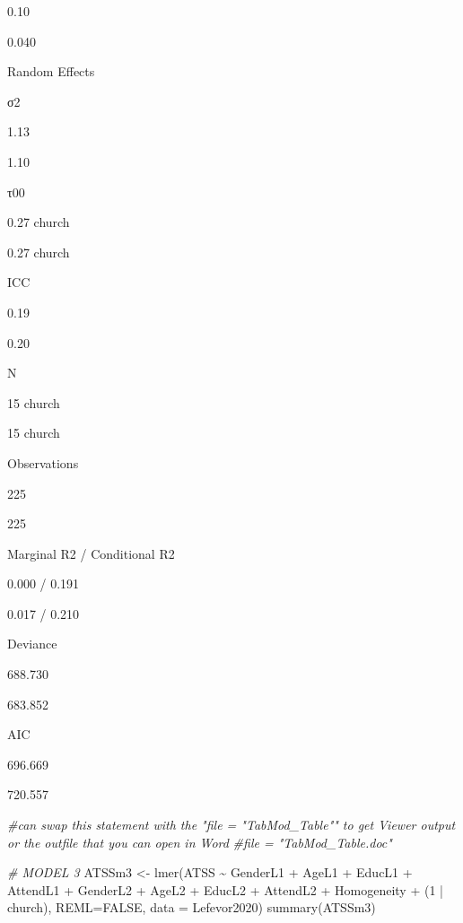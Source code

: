 \documentclass[
  11pt,
]{book}
\newenvironment{Shaded}{\begin{snugshade}}{\end{snugshade}}
\newcommand{\AttributeTok}[1]{\textcolor[rgb]{0.77,0.63,0.00}{#1}}
\newcommand{\CommentTok}[1]{\textcolor[rgb]{0.56,0.35,0.01}{\textit{#1}}}
\newcommand{\ConstantTok}[1]{\textcolor[rgb]{0.00,0.00,0.00}{#1}}
\newcommand{\DecValTok}[1]{\textcolor[rgb]{0.00,0.00,0.81}{#1}}
\newcommand{\FunctionTok}[1]{\textcolor[rgb]{0.00,0.00,0.00}{#1}}
\newcommand{\NormalTok}[1]{#1}
\newcommand{\OtherTok}[1]{\textcolor[rgb]{0.56,0.35,0.01}{#1}}
\newcommand{\SpecialCharTok}[1]{\textcolor[rgb]{0.00,0.00,0.00}{#1}}
\begin{document}
0.10

0.040

Random Effects

σ2

1.13

1.10

τ00

0.27 church

0.27 church

ICC

0.19

0.20

N

15 church

15 church

Observations

225

225

Marginal R2 / Conditional R2

0.000 / 0.191

0.017 / 0.210

Deviance

688.730

683.852

AIC

696.669

720.557

\begin{Shaded}
\begin{Highlighting}[]
\CommentTok{\#can swap this statement with the "file = "TabMod\_Table"" to get Viewer output or the outfile that you can open in Word}
\CommentTok{\#file = "TabMod\_Table.doc"}
\end{Highlighting}
\end{Shaded}

\begin{Shaded}
\begin{Highlighting}[]
\CommentTok{\# MODEL 3}
\NormalTok{ATSSm3 }\OtherTok{\textless{}{-}} \FunctionTok{lmer}\NormalTok{(ATSS }\SpecialCharTok{\textasciitilde{}}\NormalTok{ GenderL1 }\SpecialCharTok{+}\NormalTok{ AgeL1 }\SpecialCharTok{+}\NormalTok{ EducL1 }\SpecialCharTok{+}\NormalTok{ AttendL1 }\SpecialCharTok{+}\NormalTok{ GenderL2 }\SpecialCharTok{+}\NormalTok{ AgeL2 }\SpecialCharTok{+}\NormalTok{ EducL2 }\SpecialCharTok{+}\NormalTok{ AttendL2 }\SpecialCharTok{+}\NormalTok{ Homogeneity }\SpecialCharTok{+}\NormalTok{ (}\DecValTok{1} \SpecialCharTok{|}\NormalTok{ church), }\AttributeTok{REML=}\ConstantTok{FALSE}\NormalTok{, }\AttributeTok{data =}\NormalTok{ Lefevor2020)}
\FunctionTok{summary}\NormalTok{(ATSSm3)}
\end{Highlighting}
\end{Shaded}
\end{document}
